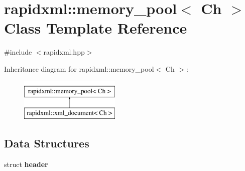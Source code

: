 \hypertarget{classrapidxml_1_1memory__pool}{
\section{rapidxml::memory\_\-pool$<$ Ch $>$ Class Template Reference}
\label{d1/d46/classrapidxml_1_1memory__pool}
}


{\ttfamily \#include $<$rapidxml.hpp$>$}

Inheritance diagram for rapidxml::memory\_\-pool$<$ Ch $>$:\begin{figure}[H]
\begin{center}
\leavevmode
\includegraphics[height=2.000000cm]{d1/d46/classrapidxml_1_1memory__pool}
\end{center}
\end{figure}
\subsection*{Data Structures}
\begin{DoxyCompactItemize}
\item 
struct {\bfseries header}
\end{DoxyCompactItemize}
